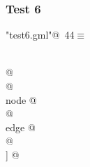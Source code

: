 \documentclass[a4paper]{report}
\begin{document}
\subsubsection{Test 6}
\begin{flushleft} \small
\begin{minipage}{\linewidth}\label{scrap44}\raggedright\small
{} \verb@"test6.gml"@\nobreak\ {\footnotesize {44}}$\equiv$
\vspace{-1ex}
\begin{list}{}{} \item
\mbox{}\verb@@\\
\mbox{}\verb@graph  @\\
\mbox{}\verb@[ hierarchic  1  @\\
\mbox{}\verb@  directed  1  @\\
\mbox{}\verb@  node  @\\
\mbox{}\verb@  [ id  0  @\\
\mbox{}\verb@  ]  @\\
\mbox{}\verb@  node  @\\
\mbox{}  @\\
\mbox{}\verb@  edge  @\\
\mbox{}  @\\
\mbox{}\verb@] @\\
\mbox{}\verb@@{\NWsep}
\end{list}
\vspace{-1.5ex}
\footnotesize
\begin{list}{}{\setlength{\itemsep}{-\parsep}\setlength{\itemindent}{-\leftmargin}}

\item{}
\end{list}
\end{minipage}\vspace{4ex}
\end{flushleft}
\end{document}
